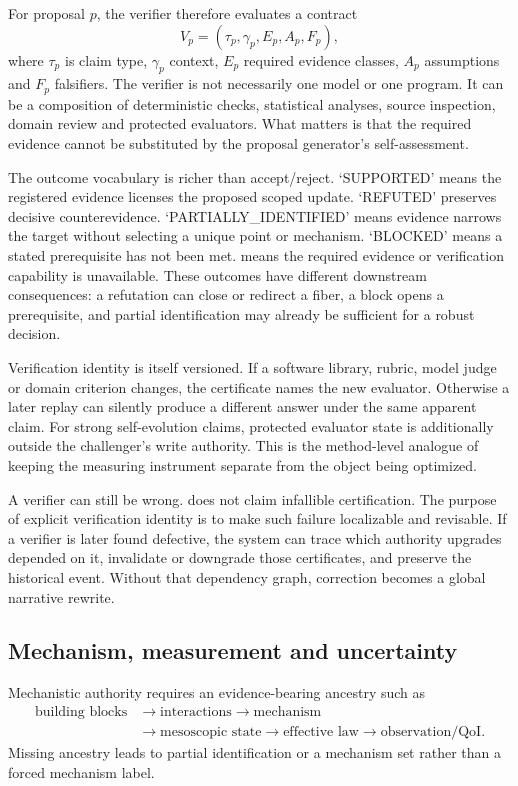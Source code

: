 For proposal \(p\), the verifier therefore evaluates a contract
\[
V_p=(\tau_p,\gamma_p,E_p,A_p,F_p),
\]
where \(\tau_p\) is claim type, \(\gamma_p\) context, \(E_p\) required evidence classes, \(A_p\) assumptions and \(F_p\) falsifiers. The verifier is not necessarily one model or one program. It can be a composition of deterministic checks, statistical analyses, source inspection, domain review and protected evaluators. What matters is that the required evidence cannot be substituted by the proposal generator's self-assessment.

The outcome vocabulary is richer than accept/reject. `SUPPORTED' means the registered evidence licenses the proposed scoped update. `REFUTED' preserves decisive counterevidence. `PARTIALLY\_IDENTIFIED' means evidence narrows the target without selecting a unique point or mechanism. `BLOCKED' means a stated prerequisite has not been met. \CannotCheck{} means the required evidence or verification capability is unavailable. These outcomes have different downstream consequences: a refutation can close or redirect a fiber, a block opens a prerequisite, and partial identification may already be sufficient for a robust decision.

Verification identity is itself versioned. If a software library, rubric, model judge or domain criterion changes, the certificate names the new evaluator. Otherwise a later replay can silently produce a different answer under the same apparent claim. For strong self-evolution claims, protected evaluator state is additionally outside the challenger's write authority. This is the method-level analogue of keeping the measuring instrument separate from the object being optimized.

A verifier can still be wrong. \RAKL{} does not claim infallible certification. The purpose of explicit verification identity is to make such failure localizable and revisable. If a verifier is later found defective, the system can trace which authority upgrades depended on it, invalidate or downgrade those certificates, and preserve the historical event. Without that dependency graph, correction becomes a global narrative rewrite.

\subsection{Mechanism, measurement and uncertainty}
Mechanistic authority requires an evidence-bearing ancestry such as
\begin{equation}
\begin{aligned}
\text{building blocks}&\to\text{interactions}\to\text{mechanism}\\
&\to\text{mesoscopic state}\to\text{effective law}\to\text{observation/QoI}.
\end{aligned}
\end{equation}
Missing ancestry leads to partial identification or a mechanism set rather than a forced mechanism label.

